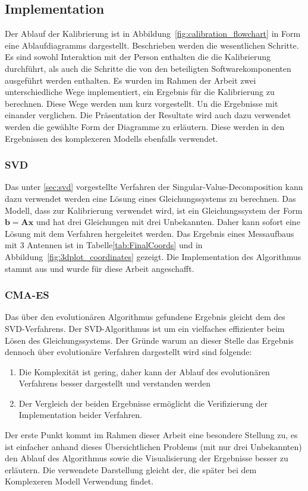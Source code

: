 \subsection{Implementation}
%
Der Ablauf der Kalibrierung ist in Abbildung~\ref{fig:calibration_flowchart} in Form eine Ablaufdiagramms dargestellt. Beschrieben werden die wesentlichen Schritte. Es sind sowohl Interaktion mit der Person enthalten die die Kalibrierung durchführt, als auch die Schritte die von den beteiligten Softwarekomponenten ausgeführt werden enthalten. Es wurden im Rahmen der Arbeit zwei unterschiedliche Wege implementiert, ein Ergebnis für die Kalibrierung zu berechnen. Diese Wege werden nun kurz vorgestellt. Un die Ergebnisse mit einander verglichen. Die Präsentation der Resultate wird auch dazu verwendet werden die gewählte Form der Diagramme zu erläutern. Diese werden in den Ergebnissen des komplexeren Modells ebenfalls verwendet.
%


\subsubsection{SVD}
%
Das unter \ref{sec:svd} vorgestellte Verfahren der Singular-Value-Decomposition kann dazu verwendet werden eine Lösung eines Gleichungssystems zu berechnen. Das Modell, dass zur Kalibrierung verwendet wird, ist ein Gleichungssystem der Form $\mathbf{b}=\mathbf{A}\mathbf{x}$ und hat drei Gleichungen mit drei Unbekannten. Daher kann sofort eine Lösung mit dem Verfahren hergeleitet werden. Das Ergebnis eines Messaufbaus mit 3 Antennen ist in Tabelle\ref{tab:FinalCoords} und in Abbildung~\ref{fig:3dplot_coordinates} gezeigt. Die Implementation des Algorithmus stammt aus \cite{press2007numerical} und wurde für diese Arbeit angeschafft.
%
\subsubsection{CMA-ES}
Das über den evolutionären Algorithmus gefundene Ergebnis gleicht dem des SVD-Verfahrens. Der SVD-Algorithmus ist um ein vielfaches effizienter beim Lösen des Gleichungssystems. Der Gründe warum an dieser Stelle das Ergebnis dennoch über evolutionäre Verfahren dargestellt wird sind folgende:
%
\begin{enumerate}
 \item Die Komplexität ist gering, daher kann der Ablauf des evolutionären Verfahrens besser dargestellt und verstanden werden
 \item Der Vergleich der beiden Ergebnisse ermöglicht die Verifizierung der Implementation beider Verfahren.
\end{enumerate}
%
Der erste Punkt kommt im Rahmen dieser Arbeit eine besondere Stellung zu, es ist einfacher anhand dieses Übersichtlichen Problems (mit nur drei Unbekannten) den Ablauf des Algorithmus sowie die Visualisierung der Ergebnisse besser zu erläutern. Die verwendete Darstellung gleicht der, die später bei dem Komplexeren Modell Verwendung findet.
%
